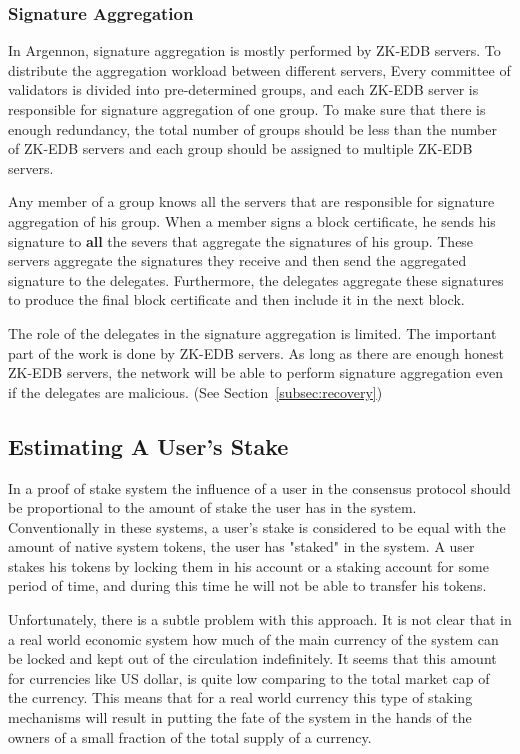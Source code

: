 \subsubsection{Signature Aggregation}

In Argennon, signature aggregation is mostly performed by ZK-EDB servers. To distribute the aggregation workload
between different servers, Every committee of validators is divided into pre-determined groups, and each ZK-EDB
server is responsible for signature aggregation of one group. To make sure that there is enough redundancy, the
total number of groups should be less than the number of ZK-EDB servers and each group should be assigned to
multiple ZK-EDB servers.

Any member of a group knows all the servers that are responsible for signature aggregation of his group. When a member
signs a block certificate, he sends his signature to \textbf{all} the severs that aggregate the signatures of his group.
These servers aggregate the signatures they receive and then send the aggregated signature to the delegates.
Furthermore, the delegates aggregate these signatures to produce the final block certificate
and then include it in the next block.

The role of the delegates in the signature aggregation is limited. The important part of the work is done by ZK-EDB
servers. As long as there are enough honest ZK-EDB servers, the network will be able to perform signature aggregation
even if the delegates are malicious. (See Section~\ref{subsec:recovery})

\subsection{Estimating A User's Stake}\label{subsec:user's-stake}

In a proof of stake system the influence of a user in the consensus protocol should be proportional to the amount
of stake the user has in the system. Conventionally in these systems, a user's stake is considered to be equal with the
amount of native system tokens, the user has "staked" in the system. A user stakes his tokens by locking them in
his account or a staking account for some period of time, and during this time he will not be able to transfer
his tokens.

Unfortunately, there is a subtle problem with this approach. It is not clear that in a real world economic system
how much of the main currency of the system can be locked and kept out of the circulation indefinitely. It seems that
this amount for currencies like US dollar, is quite low comparing to the total market cap of the currency.
This means that for a real world currency this type of staking mechanisms will result in putting the
fate of the system in the hands of the owners of a small fraction of the total supply of a currency.


